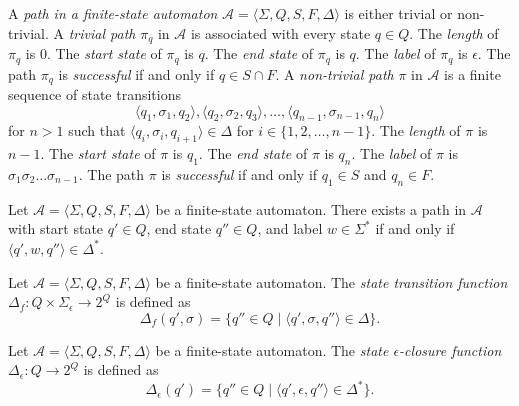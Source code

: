 \begin{definition}
  A \emph{path in a finite-state automaton} $\mathcal{A} = \langle \Sigma, Q, S, F,
  \Delta \rangle$ is either trivial or non-trivial. A \emph{trivial path} $\pi_q$ in
  $\mathcal{A}$ is associated with every state $q \in Q$. The \emph{length} of $\pi_q$ is
  $0$. The \emph{start state} of $\pi_q$ is $q$. The \emph{end state} of $\pi_q$ is $q$. The \emph{label}
  of $\pi_q$ is $\epsilon$. The path $\pi_q$ is \emph{successful} if and only if $q \in S
  \cap F$. A \emph{non-trivial path} $\pi$ in $\mathcal{A}$ is a finite sequence of state
  transitions
  \begin{equation*}
    \langle q_1, \sigma_1, q_2 \rangle, \langle q_2, \sigma_2, q_3 \rangle, \ldots,
    \langle q_{n-1}, \sigma_{n-1}, q_n \rangle
  \end{equation*}
  for $n > 1$ such that $\langle q_i, \sigma_i, q_{i+1} \rangle \in \Delta$ for $i
  \in \{ 1, 2, \ldots, n-1 \}$. The \emph{length} of $\pi$ is $n-1$. The \emph{start state} of
  $\pi$ is $q_1$. The \emph{end state} of $\pi$ is $q_n$. The \emph{label} of $\pi$ is $\sigma_1
  \sigma_2 \ldots \sigma_{n-1}$. The path $\pi$ is \emph{successful} if and only if $q_1
  \in S$ and $q_n \in F$.
\end{definition}

\begin{proposition}
  Let $\mathcal{A} = \langle \Sigma, Q, S, F, \Delta \rangle$ be a finite-state
  automaton. There exists a path in $\mathcal{A}$ with start state $q' \in Q$, end
  state $q'' \in Q$, and label $w \in \Sigma^*$ if and only if $\langle q', w, q''
  \rangle \in \Delta^*$.
\end{proposition}

\begin{definition}
  Let $\mathcal{A} = \langle \Sigma, Q, S, F, \Delta \rangle$ be a finite-state
  automaton. The \emph{state transition function} $\Delta_f : Q \times
  \Sigma_\epsilon \rightarrow 2^Q$ is defined as
  \begin{equation*}
    \Delta_f(q', \sigma) = \{ q'' \in Q \mid \langle q', \sigma, q'' \rangle \in
    \Delta \}.
  \end{equation*}
\end{definition}

\begin{definition}
  Let $\mathcal{A} = \langle \Sigma, Q, S, F, \Delta \rangle$ be a finite-state
  automaton. The \emph{state $\epsilon$-closure function} $\Delta_\epsilon : Q
  \rightarrow 2^Q$ is defined as
  \begin{equation*}
    \Delta_\epsilon(q') = \{ q'' \in Q \mid \langle q', \epsilon, q'' \rangle \in
    \Delta^* \}.
  \end{equation*}
\end{definition}

